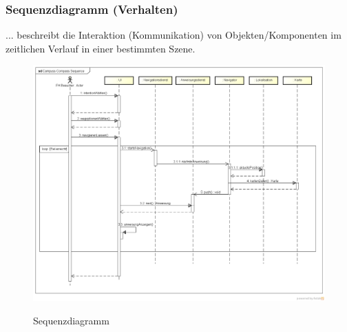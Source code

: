 \subsubsection*{Sequenzdiagramm (Verhalten)}
... beschreibt die Interaktion (Kommunikation) von Objekten/Komponenten im zeitlichen Verlauf in einer bestimmten Szene.

\begin{figure}[hbt]
  \centering
  \includegraphics[width=\linewidth]{img/sequenzdiagramm.png}
  \label{img:sequenzdiagramm}
  \caption{Sequenzdiagramm}
\end{figure}